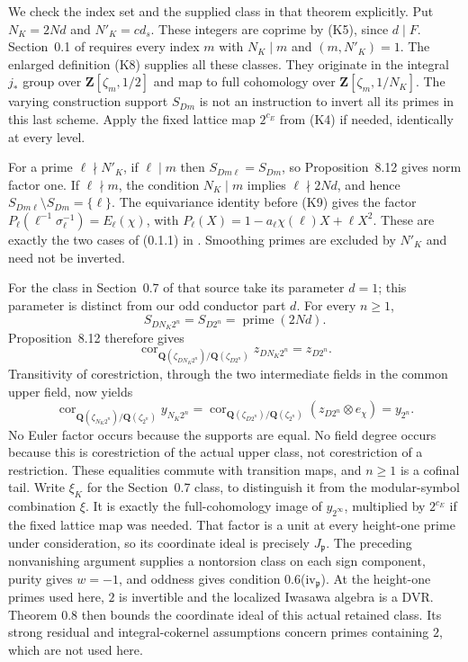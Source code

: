 We check the index set and the supplied class in that theorem
explicitly. Put $N_K=2Nd$ and $N'_K=cd_s$. These integers are
coprime by (K5), since $d\mid F$. Section~0.1 of \cite{kato1999}
requires every index $m$ with $N_K\mid m$ and $(m,N'_K)=1$.
The enlarged definition (K8) supplies all these classes. They
originate in the integral $j_*$ group over
$\mathbf Z[\zeta_m,1/2]$ and map to full cohomology over
$\mathbf Z[\zeta_m,1/N_K]$. The varying construction support
$S_{Dm}$ is not an instruction to invert all its primes in this
last scheme. Apply the fixed lattice map $2^{c_E}$ from (K4) if
needed, identically at every level.

For a prime $\ell\nmid N'_K$, if $\ell\mid m$ then
$S_{Dm\ell}=S_{Dm}$, so Proposition~8.12 gives norm factor one.
If $\ell\nmid m$, the condition $N_K\mid m$ implies
$\ell\nmid2Nd$, and hence
$S_{Dm\ell}\setminus S_{Dm}=\{\ell\}$. The equivariance identity
before (K9) gives the factor
$P_\ell(\ell^{-1}\sigma_\ell^{-1})=E_\ell(\chi)$, with
$P_\ell(X)=1-a_\ell\chi(\ell)X+\ell X^2$. These are exactly the
two cases of (0.1.1) in \cite{kato1999}. Smoothing primes are
excluded by $N'_K$ and need not be inverted.

For the class in Section~0.7 of that source take its parameter
$d=1$; this parameter is distinct from our odd conductor part $d$.
For every $n\geq1$,
\[
 S_{DN_K2^n}=S_{D2^n}=\operatorname{prime}(2Nd).
\]
Proposition~8.12 therefore gives
\[
 \operatorname{cor}_{\mathbf Q(\zeta_{DN_K2^n})/
                          \mathbf Q(\zeta_{D2^n})}
             z_{DN_K2^n}=z_{D2^n}.
\]
Transitivity of corestriction, through the two intermediate fields
in the common upper field, now yields
\[
 \operatorname{cor}_{\mathbf Q(\zeta_{N_K2^n})/
                          \mathbf Q(\zeta_{2^n})}y_{N_K2^n}
 =\operatorname{cor}_{\mathbf Q(\zeta_{D2^n})/
                          \mathbf Q(\zeta_{2^n})}
                         (z_{D2^n}\otimes e_\chi)
 =y_{2^n}.
\]
No Euler factor occurs because the supports are equal. No field
degree occurs because this is corestriction of the actual upper
class, not corestriction of a restriction. These equalities commute
with transition maps, and $n\geq1$ is a cofinal tail. Write
$\xi_K$ for the Section~0.7 class, to distinguish it from the
modular-symbol combination $\xi$. It is exactly the full-cohomology
image of $y_{2^\infty}$, multiplied by $2^{c_E}$ if the fixed
lattice map was needed. That factor is a unit at every height-one
prime under consideration, so its coordinate ideal is precisely
$J_{\mathfrak p}$. The preceding
nonvanishing argument supplies a nontorsion class on each sign
component, purity gives $w=-1$, and oddness gives condition
0.6(iv$_{\mathfrak p}$). At the height-one primes used here, $2$ is
invertible and the localized Iwasawa algebra is a DVR. Theorem 0.8
then bounds the coordinate ideal of this actual retained class. Its
strong residual and integral-cokernel assumptions concern primes
containing $2$, which are not used here.

